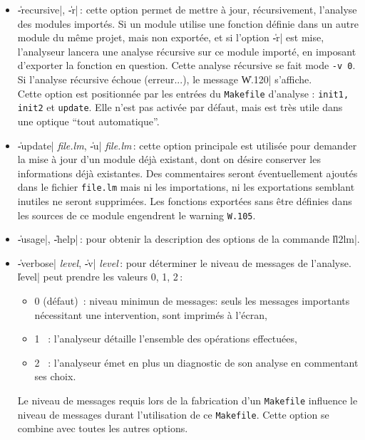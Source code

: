 \begin{itemize}
\item {\Large \|-recursive|, \|-r|}\,: cette option permet de mettre \`{a} jour,
r\'{e}cursivement, l'analyse des modules import\'{e}s. Si un module utilise
une fonction d\'{e}finie dans un autre module du m\^{e}me projet, mais non
export\'{e}e, et si l'option \|-r| est mise, l'analyseur lancera une
analyse r\'{e}cursive sur ce module import\'{e}, en imposant d'exporter la
fonction en question. Cette analyse r\'{e}cursive se fait mode {\tt -v
0}. Si l'analyse r\'{e}cursive \'{e}choue (erreur...), le message \|W.120|
s'affiche. \\
Cette option est positionn\'{e}e par les entr\'{e}es du {\tt Makefile}
d'analyse : {\tt init1, init2} et {\tt update}. Elle n'est pas
activ\'{e}e par d\'{e}faut, mais est tr\`{e}s utile dans une optique ``tout
automatique{''}. 

\item {\Large \|-update| {\em file.lm}, \|-u| {\em file.lm}}\,: cette option
principale est utilis\'{e}e pour demander la
mise \`{a} jour d'un module d\'{e}j\`{a} existant, dont on d\'{e}sire conserver
les informations d\'{e}j\`{a} existantes. Des commentaires seront
\'{e}ventuellement ajout\'{e}s dans le fichier {\tt file.lm} mais ni les
importations, ni les exportations semblant inutiles ne seront
supprim\'{e}es. Les fonctions export\'{e}es sans \^{e}tre d\'{e}finies dans
les sources de ce module engendrent le warning {\tt W.105}.

\item {\Large \|-usage|, \|-help|}\,: pour obtenir la description des options de
la commande \|ll2lm|.

\item {\Large \|-verbose| {\em level}, \|-v| {\em level}}\,: pour d\'{e}terminer le
niveau de 
messages de l'analyse. \|level| peut prendre les valeurs 0, 1, 2\,: 
\begin{itemize}
\item 0 (d\'{e}faut)\ :
niveau minimun de messages: seuls les messages importants
n\'{e}cessitant une intervention, sont imprim\'{e}s \`{a} l'\'{e}cran,
\item 1 \ :
l'analyseur d\'{e}taille l'ensemble des op\'{e}rations effectu\'{e}es,
\item 2 \ :
l'analyseur \'{e}met en plus un diagnostic de son analyse en commentant
ses choix.
\end{itemize}
Le niveau de messages requis lors de la fabrication d'un {\tt Makefile}
influence le niveau de messages durant l'utilisation de ce {\tt Makefile}.
Cette option se combine avec toutes les autres options.

\end{itemize}

